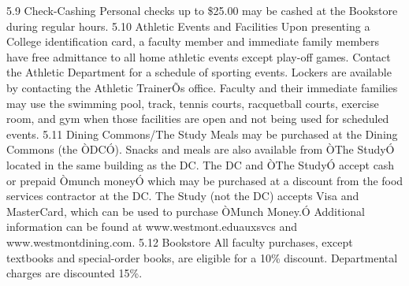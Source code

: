\documentclass[letterpaper, 11pt]{article}
\begin{document}
5.9 Check-Cashing
   Personal checks up to \$25.00 may be cashed at the Bookstore during regular hours.
5.10 Athletic Events and Facilities
   Upon presenting a College identification card, a faculty member and immediate family members have free admittance to all home athletic events except play-off games.  Contact the Athletic Department for a schedule of sporting events.  Lockers are available by contacting the Athletic TrainerÕs office.  Faculty and their immediate families may use the swimming pool, track, tennis courts, racquetball courts, exercise room, and gym when those facilities are open and not being used for scheduled events.
5.11 Dining Commons/The Study
   Meals may be purchased at the Dining Commons (the ÒDCÓ).  Snacks and meals are also available from ÒThe StudyÓ located in the same building as the DC.  The DC and ÒThe StudyÓ accept cash or prepaid Òmunch moneyÓ which may be purchased at a discount from the food services contractor at the DC.  The Study (not the DC) accepts Visa and MasterCard, which can be used to purchase ÒMunch Money.Ó  Additional information can be found at www.westmont.eduauxsvcs and www.westmontdining.com.
5.12 Bookstore
   All faculty purchases, except textbooks and special-order books, are eligible
   for a 10\% discount.  Departmental charges are discounted 15\%.
\end{document}
